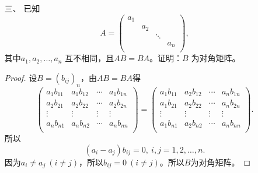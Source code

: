 \begin{enumerate}[1~]
\begin{proof}
\begin{equation}
\end{equation}
其中$\alpha$，$\beta$是方程$x^2-2\cos a+1$的两个根：\[
\alpha=\cos a-\sqrt{\cos^2a-1}, \beta=\cos a+\sqrt{\cos^2a+1}.
\]
从而\begin{equation}\label{alphan-2}
D_n-\alpha D_{n-1}=\beta^{n-2}(D_2-\alpha D_1)=\beta^{n-2}(2\cos^2a-1-\alpha\cos a)=\beta^{n-2}(\cos2a-\alpha\cos a).
\end{equation}
由对称性，\begin{equation}\label{betan-2}
D_n-\beta D_{n-1}=\alpha^{n-2}(D_2-\beta D_1)=\alpha^{n-2}(2\cos^2a-1-\beta\cos a)=\alpha^{n-2}(\cos2a-\beta\cos a).
\end{equation}
由 \eqref{alphan-2} 和 \eqref{betan-2} 得\[
D_n=\frac{\beta^{n-1}(\cos a-\alpha\cos a)-\alpha^{n-1}(\cos a-\beta\cos a)}{\beta-\alpha}.
\]
其中$\alpha=\cos a-\sqrt{\cos^2a-1}, \beta=\cos a+\sqrt{\cos^2a+1}$。
\end{proof}

\item[三、]
已知\[
A=\left( \begin{matrix}
	a_1&		&		&		\\
	&		a_2&		&		\\
	&		&		\ddots&		\\
	&		&		&		a_n\\
\end{matrix} \right),
\]
其中$a_1, a_2, \dots, a_n$ 互不相同，且$AB = BA$。证明：$B$ 为对角矩阵。
\begin{proof}
设$B=(b_{ij})_n$，由$AB=BA$得\[
\left( \begin{matrix}
	a_1b_{11}&		a_1b_{12}&		\cdots&		a_1b_{1n}\\
	a_2b_{21}&		a_2b_{22}&		\cdots&		a_2b_{2n}\\
	\vdots&		\vdots&		\vdots&		\vdots\\
	a_nb_{n1}&		a_nb_{n2}&		\cdots&		a_nb_{nn}\\
\end{matrix} \right) =\left( \begin{matrix}
	a_1b_{11}&		a_2b_{12}&		\cdots&		a_nb_{1n}\\
	a_1b_{21}&		a_2b_{22}&		\cdots&		a_nb_{2n}\\
	\vdots&		\vdots&		\vdots&		\vdots\\
	a_1b_{n1}&		a_2b_{n2}&		\cdots&		a_nb_{nn}\\
\end{matrix} \right) .
\]
所以\[
(a_i-a_j)b_{ij}=0,\ i, j=1, 2, \dots, n.
\]
因为$a_i\ne a_j \ (i\ne j)$，所以$b_{ij}=0\ (i\ne j)$。所以$B$为对角矩阵。
\end{proof}


\end{enumerate}
